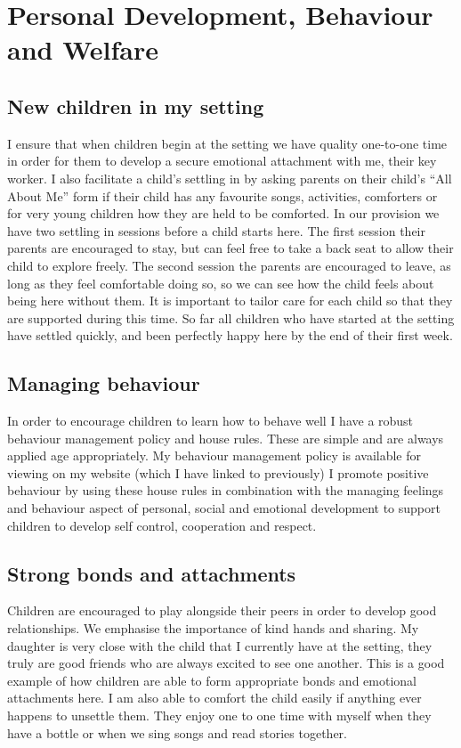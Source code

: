 \documentclass[10pt,a4paper]{report}
\begin{document}
\chapter{Personal Development, Behaviour and Welfare}

\section{New children in my setting}

I ensure that when children begin at the setting we have quality one-to-one time in order for them to develop a secure emotional attachment with me, their key worker. I also facilitate a child's settling in by asking parents on their child's “All About Me” form if their child has any favourite songs, activities, comforters or for very young children how they are held to be comforted. In our provision we have two settling in sessions before a child starts here. The first session their parents are encouraged to stay, but can feel free to take a back seat to allow their child to explore freely. The second session the parents are encouraged to leave, as long as they feel comfortable doing so, so we can see how the child feels about being here without them. It is important to tailor care for each child so that they are supported during this time. So far all children who have started at the setting have settled quickly, and been perfectly happy here by the end of their first week.

\section{Managing behaviour}

In order to encourage children to learn how to behave well I have a robust behaviour management policy and house rules. These are simple and are always applied age appropriately. My behaviour management policy is available for viewing on my website (which I have linked to previously) I promote positive behaviour by using these house rules in combination with the managing feelings and behaviour aspect of personal, social and emotional development to support children to develop self control, cooperation and respect.

\section{Strong bonds and attachments}

Children are encouraged to play alongside their peers in order to develop good relationships. We emphasise the importance of kind hands and sharing. My daughter is very close with the child that I currently have at the setting, they truly are good friends who are always excited to see one another. This is a good example of how children are able to form appropriate bonds and emotional attachments here. I am also able to comfort the child easily if anything ever happens to unsettle them. They enjoy one to one time with myself when they have a bottle or when we sing songs and read stories together. 
\end{document}
